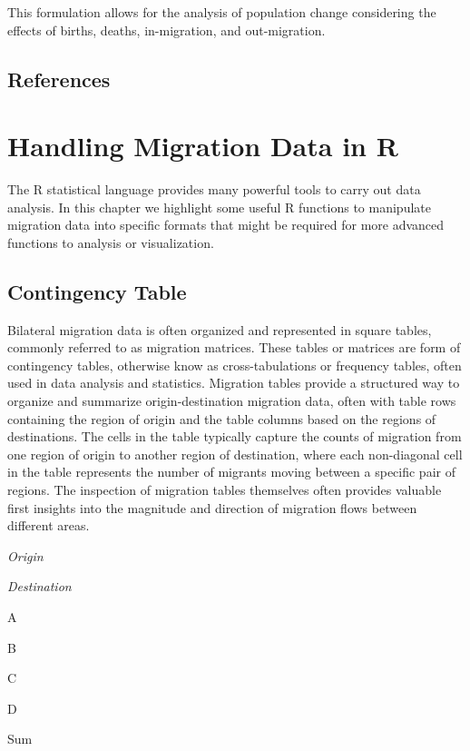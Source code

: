 \documentclass[
]{book}
\begin{document}
This formulation allows for the analysis of population change considering the effects of births, deaths, in-migration, and out-migration.

\hypertarget{references}{%
\section{References}\label{references}}

\hypertarget{handling-migration-data-in-r}{%
\chapter{Handling Migration Data in R}\label{handling-migration-data-in-r}}

The R statistical language provides many powerful tools to carry out data analysis. In this chapter we highlight some useful R functions to manipulate migration data into specific formats that might be required for more advanced functions to analysis or visualization.

\hypertarget{contingency-table}{%
\section{Contingency Table}\label{contingency-table}}

Bilateral migration data is often organized and represented in square tables, commonly referred to as migration matrices. These tables or matrices are form of contingency tables, otherwise know as cross-tabulations or frequency tables, often used in data analysis and statistics. Migration tables provide a structured way to organize and summarize origin-destination migration data, often with table rows containing the region of origin and the table columns based on the regions of destinations. The cells in the table typically capture the counts of migration from one region of origin to another region of destination, where each non-diagonal cell in the table represents the number of migrants moving between a specific pair of regions. The inspection of migration tables themselves often provides valuable first insights into the magnitude and direction of migration flows between different areas.

\emph{Origin}

\emph{Destination}

A

B

C

D

Sum
\end{document}

